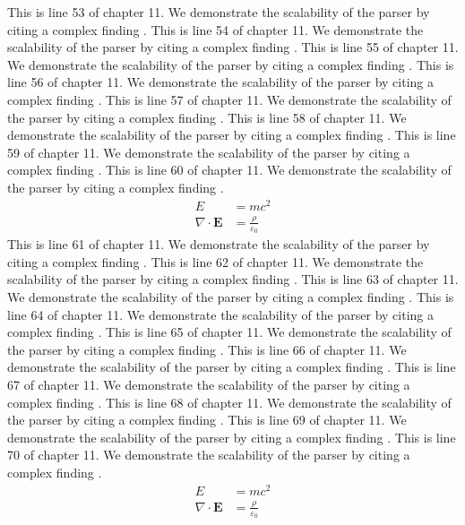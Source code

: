 This is line 53 of chapter 11. We demonstrate the scalability of the parser by citing a complex finding \cite{ref11_53}.
This is line 54 of chapter 11. We demonstrate the scalability of the parser by citing a complex finding \cite{ref11_54}.
This is line 55 of chapter 11. We demonstrate the scalability of the parser by citing a complex finding \cite{ref11_55}.
This is line 56 of chapter 11. We demonstrate the scalability of the parser by citing a complex finding \cite{ref11_56}.
This is line 57 of chapter 11. We demonstrate the scalability of the parser by citing a complex finding \cite{ref11_57}.
This is line 58 of chapter 11. We demonstrate the scalability of the parser by citing a complex finding \cite{ref11_58}.
This is line 59 of chapter 11. We demonstrate the scalability of the parser by citing a complex finding \cite{ref11_59}.
This is line 60 of chapter 11. We demonstrate the scalability of the parser by citing a complex finding \cite{ref11_60}.
\begin{align*}
  E &= mc^2 \\
  \nabla \cdot \mathbf{E} &= \frac{\rho}{\varepsilon_0}
\end{align*}
This is line 61 of chapter 11. We demonstrate the scalability of the parser by citing a complex finding \cite{ref11_61}.
This is line 62 of chapter 11. We demonstrate the scalability of the parser by citing a complex finding \cite{ref11_62}.
This is line 63 of chapter 11. We demonstrate the scalability of the parser by citing a complex finding \cite{ref11_63}.
This is line 64 of chapter 11. We demonstrate the scalability of the parser by citing a complex finding \cite{ref11_64}.
This is line 65 of chapter 11. We demonstrate the scalability of the parser by citing a complex finding \cite{ref11_65}.
This is line 66 of chapter 11. We demonstrate the scalability of the parser by citing a complex finding \cite{ref11_66}.
This is line 67 of chapter 11. We demonstrate the scalability of the parser by citing a complex finding \cite{ref11_67}.
This is line 68 of chapter 11. We demonstrate the scalability of the parser by citing a complex finding \cite{ref11_68}.
This is line 69 of chapter 11. We demonstrate the scalability of the parser by citing a complex finding \cite{ref11_69}.
This is line 70 of chapter 11. We demonstrate the scalability of the parser by citing a complex finding \cite{ref11_70}.
\begin{align*}
  E &= mc^2 \\
  \nabla \cdot \mathbf{E} &= \frac{\rho}{\varepsilon_0}
\end{align*}
